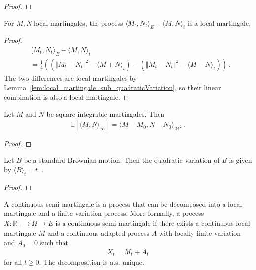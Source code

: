 \begin{proof}

\end{proof}


\begin{lemma}\label{lem:local_martingale_sub_covariation}
For $M, N$ local martingales, the process $\langle M_t, N_t \rangle_E - \langle M, N \rangle_t$ is a local martingale.
\end{lemma}

\begin{proof}
\begin{align*}
  &\langle M_t, N_t \rangle_E - \langle M, N \rangle_t
  \\
  &= \frac{1}{4}\left( \left(\Vert M_t + N_t \Vert^2 - \langle M+N \rangle_t\right) - \left(\Vert M_t - N_t \Vert^2 - \langle M-N \rangle_t\right) \right)
  \: .
\end{align*}
The two differences are local martingales by Lemma~\ref{lem:local_martingale_sub_quadraticVariation}, so their linear combination is also a local martingale.
\end{proof}


\begin{lemma}\label{lem:covariation_eq_inner}
Let $M$ and $N$ be square integrable martingales. Then
\begin{align*}
  \mathbb{E}\left[\langle M,N \rangle_\infty\right] = \langle M - M_0, N - N_0 \rangle_{\mathcal{M}^2}
  \: .
\end{align*}
\end{lemma}

\begin{proof}

\end{proof}


\begin{lemma}\label{lem:quadraticVariation_brownian}
Let $B$ be a standard Brownian motion. Then the quadratic variation of $B$ is given by $\langle B \rangle_t = t$~.
\end{lemma}

\begin{proof}

\end{proof}


\begin{definition}\label{def:continuousSemiMartingale}
A continuous semi-martingale is a process that can be decomposed into a local martingale and a finite variation process.
More formally, a process $X : \mathbb{R}_+ \to \Omega \to E$ is a continuous semi-martingale if there exists a continuous local martingale $M$ and a continuous adapted process $A$ with locally finite variation and $A_0 = 0$ such that
\begin{align*}
  X_t = M_t + A_t
\end{align*}
for all $t \ge 0$.
The decomposition is a.s. unique.
\end{definition}






